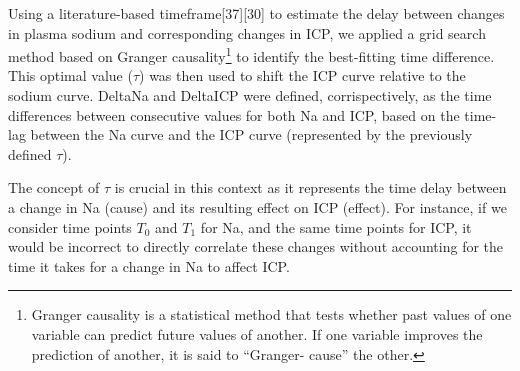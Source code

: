 Using a literature-based timeframe[37][30] to estimate the delay between changes in plasma sodium and corresponding changes in ICP, we applied a grid search method based on Granger causality\footnote{Granger causality is a statistical method that tests whether past values of one variable can predict future values of another. If one variable improves the prediction of another, it is said to “Granger- cause” the other.} to identify the best-fitting time difference. This optimal value ($\tau$) was then used to shift the ICP curve relative to the sodium curve. DeltaNa and DeltaICP were defined, corrispectively, as the time differences between consecutive values for both Na and ICP, based on the time-lag between the Na curve and the ICP curve (represented by the previously defined $\tau$).

The concept of $\tau$ is crucial in this context as it represents the time delay between a change in Na (cause) and its resulting effect on ICP (effect). For instance, if we consider time points $T_0$ and $T_1$ for Na, and the same time points for ICP, it would be incorrect to directly correlate these changes without accounting for the time it takes for a change in Na to affect ICP. 




